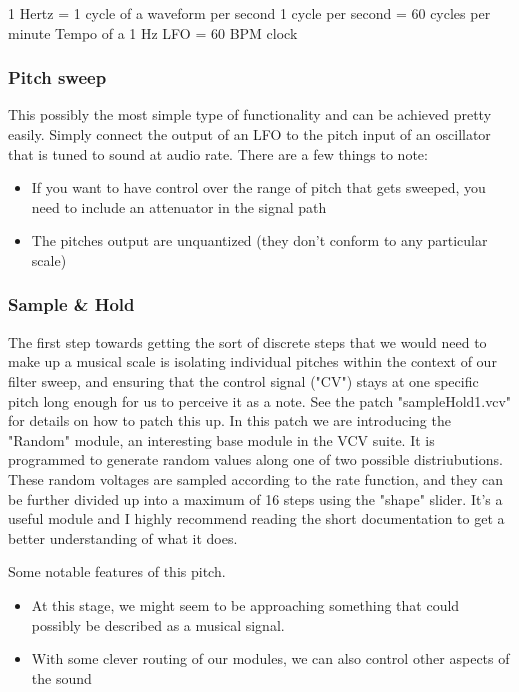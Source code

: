 \documentclass[11pt]{article}
\begin{document}
1 Hertz = 1 cycle of a waveform per second
1 cycle per second = 60 cycles per minute
Tempo of a 1 Hz LFO = 60 BPM clock

\subsubsection{Pitch sweep}
\label{sec:org63cc852}
This possibly the most simple type of functionality and can be achieved
pretty easily. Simply connect the output of an LFO to the pitch input
of an oscillator that is tuned to sound at audio rate. There are a few
things to note:
\begin{itemize}
\item If you want to have control over the range of pitch that gets
sweeped, you need to include an attenuator in the signal path
\item The pitches output are unquantized (they don't conform to any
particular scale)
\end{itemize}

\subsubsection{Sample \& Hold}
\label{sec:orgc343646}
The first step towards getting the sort of discrete steps that we
would need to make up a musical scale is isolating individual pitches
within the context of our filter sweep, and ensuring that the control
signal ("CV") stays at one specific pitch long enough for us to
perceive it as a note. See the patch "sampleHold1.vcv" for details on
how to patch this up.
In this patch we are introducing the "Random" module, an interesting
base module in the VCV suite. It is programmed to generate random
values along one of two possible distriubutions. These random voltages
are sampled according to the rate function, and they can be further
divided up into a maximum of 16 steps using the "shape" slider. It's a
useful module and I highly recommend reading the short documentation
to get a better understanding of what it does. 

Some notable features of this pitch. 
\begin{itemize}
\item At this stage, we might seem to be approaching something that could
possibly be described as a musical signal.
\item With some clever routing of our modules, we can also control other
aspects of the sound
\end{itemize}
\end{document}

